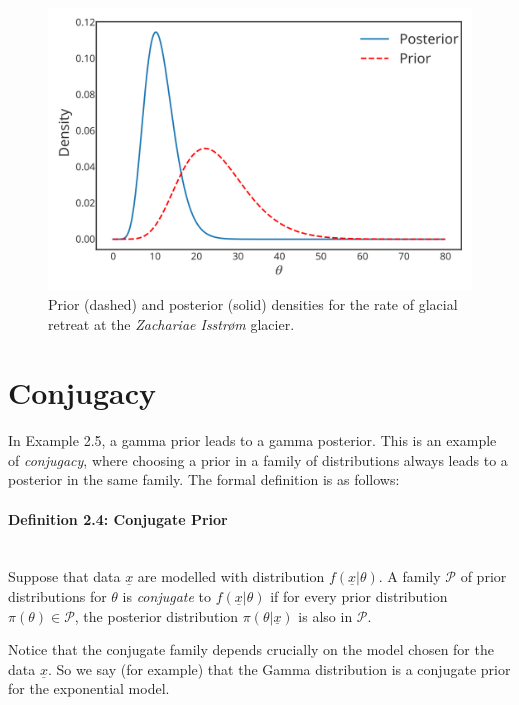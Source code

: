{{    
}

\newpage 

\begin{figure}[h]

\includegraphics{images/glacier_posterior.svg}
\caption{Prior (dashed) and posterior (solid) densities for the rate of glacial retreat at the \textit{Zachariae Isstr\o m} glacier.}

\end{figure}}


\section{Conjugacy}

In Example 2.5, a gamma prior leads to a gamma posterior.
This is an example of {\it conjugacy}, where choosing a prior in a family of distributions
always leads to a posterior in the same family.
The formal definition is as follows:

\paragraph{Definition 2.4: Conjugate Prior}{~\\
Suppose that data $\underline{x}$ are modelled with distribution
$f(\underline{x}|\theta)$. A family $\mathcal{P}$ of prior distributions for
$\theta$ is \emph{conjugate} to $f(\underline{x}|\theta)$ if
for every prior distribution $\pi(\theta)\in\mathcal{P}$, the
posterior distribution $\pi(\theta|\underline{x})$ is also in $\mathcal{P}$.}

Notice that the conjugate family depends crucially on the model chosen
for the data $\underline{x}$. So we say (for example) that the Gamma distribution
is a conjugate prior for the exponential model.

